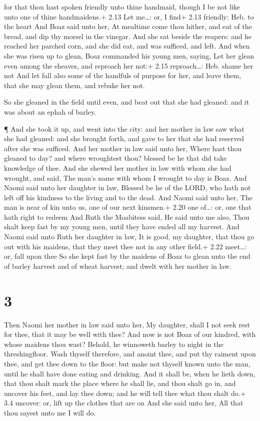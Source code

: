 for that thou hast spoken friendly unto thine handmaid, though I be not
like unto one of thine handmaidens.+ 2.13 Let me\ldots: or, I find+ 2.13
friendly: Heb. to the heart  And Boaz said unto her, At
mealtime come thou hither, and eat of the bread, and dip thy morsel in
the vinegar. And she sat beside the reapers: and he reached her parched
corn, and she did eat, and was sufficed, and left.  And
when she was risen up to glean, Boaz commanded his young men, saying,
Let her glean even among the sheaves, and reproach her not:+ 2.15
reproach\ldots: Heb. shame her not  And let fall also some
of the handfuls of purpose for her, and leave them, that she may glean
them, and rebuke her not.

 So she gleaned in the field until even, and beat out that
she had gleaned: and it was about an ephah of barley.

 ¶ And she took it up, and went into the city: and her
mother in law saw what she had gleaned: and she brought forth, and gave
to her that she had reserved after she was sufficed.  And
her mother in law said unto her, Where hast thou gleaned to day? and
where wroughtest thou? blessed be he that did take knowledge of thee.
And she shewed her mother in law with whom she had wrought, and said,
The man's name with whom I wrought to day is Boaz.  And
Naomi said unto her daughter in law, Blessed be he of the LORD, who hath
not left off his kindness to the living and to the dead. And Naomi said
unto her, The man is near of kin unto us, one of our next kinsmen.+ 2.20
one of\ldots: or, one that hath right to redeem  And Ruth
the Moabitess said, He said unto me also, Thou shalt keep fast by my
young men, until they have ended all my harvest.  And Naomi
said unto Ruth her daughter in law, It is good, my daughter, that thou
go out with his maidens, that they meet thee not in any other field.+
2.22 meet\ldots: or, fall upon thee  So she kept fast by
the maidens of Boaz to glean unto the end of barley harvest and of wheat
harvest; and dwelt with her mother in law.

\hypertarget{section-2}{%
\section{3}\label{section-2}}

 Then Naomi her mother in law said unto her, My daughter,
shall I not seek rest for thee, that it may be well with thee?
 And now is not Boaz of our kindred, with whose maidens thou
wast? Behold, he winnoweth barley to night in the threshingfloor.
 Wash thyself therefore, and anoint thee, and put thy
raiment upon thee, and get thee down to the floor: but make not thyself
known unto the man, until he shall have done eating and drinking.
 And it shall be, when he lieth down, that thou shalt mark
the place where he shall lie, and thou shalt go in, and uncover his
feet, and lay thee down; and he will tell thee what thou shalt do.+ 3.4
uncover: or, lift up the clothes that are on  And she said
unto her, All that thou sayest unto me I will do.

